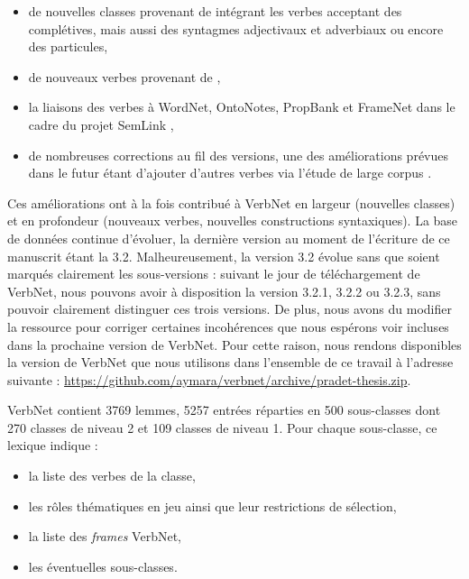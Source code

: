 \begin{itemize}

    \item de nouvelles classes provenant de \cite{korhonen2004extended}
        intégrant les verbes acceptant des complétives, mais aussi des
        syntagmes adjectivaux et adverbiaux ou encore des particules,

    \item de nouveaux verbes provenant de \cite{dorr2001lcs},

    \item la liaisons des verbes à WordNet, OntoNotes, PropBank et FrameNet
        dans le cadre du projet SemLink \citep{palmer2009semlink},

    \item de nombreuses corrections au fil des versions, une des améliorations
        prévues dans le futur étant d'ajouter d'autres verbes via l'étude de
        large corpus \citep{bonial2013expanding}.

\end{itemize}

Ces améliorations ont à la fois contribué à VerbNet en largeur (nouvelles
classes) et en profondeur (nouveaux verbes, nouvelles constructions
syntaxiques). La base de données continue d'évoluer, la dernière version au
moment de l'écriture de ce manuscrit étant la 3.2. Malheureusement, la version
3.2 évolue sans que soient marqués clairement les sous-versions : suivant le
jour de téléchargement de VerbNet, nous pouvons avoir à disposition la version
3.2.1, 3.2.2 ou 3.2.3, sans pouvoir clairement distinguer ces trois versions.
De plus, nous avons du modifier la ressource pour corriger certaines
incohérences que nous espérons voir incluses dans la prochaine version de
VerbNet. Pour cette raison, nous rendons disponibles la version de VerbNet que
nous utilisons dans l'ensemble de ce travail à l'adresse suivante :
\url{https://github.com/aymara/verbnet/archive/pradet-thesis.zip}.

VerbNet contient 3769 lemmes, 5257 entrées réparties en 500 sous-classes dont
270 classes de niveau 2 et 109 classes de niveau 1. Pour chaque sous-classe, ce
lexique indique :

\begin{itemize}
        \item la liste des verbes de la classe,
        \item les rôles thématiques en jeu ainsi que leur restrictions de sélection,
        \item la liste des \textit{frames} VerbNet,
        \item les éventuelles sous-classes.
\end{itemize}

